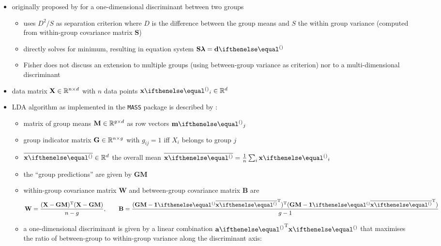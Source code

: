 \documentclass[a4paper]{article}
\begin{document}
\begin{itemize}
\item originally proposed by \citet{Fisher:36} for a one-dimensional discriminant between two groups
  \begin{itemize}
  \item uses $D^2 / S$ as separation criterion where $D$ is the difference between the group means and $S$ the within group variance (computed from within-group covariance matrix $\mathbf{S}$)
  \item directly solves for minimum, resulting in equation system $\mathbf{S} \boldsymbol{\lambda} = \vd$
  \item Fisher does not discuss an extension to multiple groups (using between-group variance as criterion) nor to a multi-dimensional discriminant
  \end{itemize}
\item data matrix $\mathbf{X}\in \mathbb{R}^{n\times d}$ with $n$ data points $\vx_i\in \setR^d$
\item LDA algorithm as implemented in the \texttt{MASS} package is described by \citet[331--332]{Venables:Ripley:02}:
  \begin{itemize}
  \item matrix of group means $\mathbf{M}\in \mathbb{R}^{g\times d}$ as row vectors $\vm_j$
  \item group indicator matrix $\mathbf{G}\in \mathbb{R}^{n\times g}$ with $g_{ij} = 1$ iff $X_i$ belongs to group $j$
  \item $\overline{\vx}\in \setR^d$ the overall mean $\overline{\vx} = \frac1n \sum_i \vx_i$
  \item the ``group predictions'' are given by $\mathbf{G}\mathbf{M}$
  \item within-group covariance matrix $\mathbf{W}$ and between-group covariance matrix $\mathbf{B}$ are
    \begin{equation}
      \label{eq:lda:mass-W-B}
      \mathbf{W} = \frac{
        (\mathbf{X} - \mathbf{GM})\T (\mathbf{X} - \mathbf{GM})
      }{ n - g }
      ,\qquad
      \mathbf{B} = \frac{
        (\mathbf{GM} - \vone \overline{\vx}\T)\T (\mathbf{GM} - \vone \overline{\vx}\T)
      }{g - 1}
    \end{equation}
  \item a one-dimensional discriminant is given by a linear combination $\va\T \vx$ that maximises the ratio of between-group to within-group variance along the discriminant axis:
    \begin{equation}
      \label{eq:lda:mass-criterion}

\end{equation}
\end{itemize}
\end{itemize}
\end{document}
